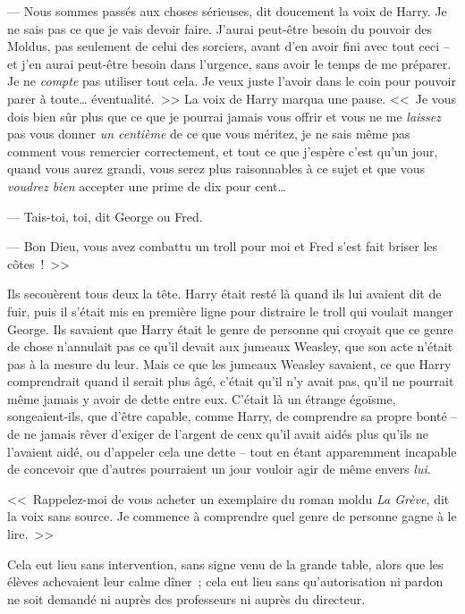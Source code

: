 --- Nous sommes passés aux choses sérieuses, dit doucement la voix de Harry. Je ne sais pas ce que je vais devoir faire. J'aurai peut-être besoin du pouvoir des Moldus, pas seulement de celui des sorciers, avant d'en avoir fini avec tout ceci -- et j'en aurai peut-être besoin dans l'urgence, sans avoir le temps de me préparer. Je ne \emph{compte} pas utiliser tout cela. Je veux juste l'avoir dans le coin pour pouvoir parer à toute… éventualité.~>> La voix de Harry marqua une pause. <<~Je vous dois bien sûr plus que ce que je pourrai jamais vous offrir et vous ne me \emph{laissez} pas vous donner \emph{un centième} de ce que vous méritez, je ne sais même pas comment vous remercier correctement, et tout ce que j'espère c'est qu'un jour, quand vous aurez grandi, vous serez plus raisonnables à ce sujet et que vous \emph{voudrez bien} accepter une prime de dix pour cent…

--- Tais-toi, toi, dit George ou Fred.

--- Bon Dieu, vous avez combattu un troll pour moi et Fred s'est fait briser les côtes~!~>>

Ils secouèrent tous deux la tête. Harry était resté là quand ils lui avaient dit de fuir, puis il s'était mis en première ligne pour distraire le troll qui voulait manger George. Ils savaient que Harry était le genre de personne qui croyait que ce genre de chose n'annulait pas ce qu'il devait aux jumeaux Weasley, que son acte n'était pas à la mesure du leur. Mais ce que les jumeaux Weasley savaient, ce que Harry comprendrait quand il serait plus âgé, c'était qu'il n'y avait pas, qu'il ne pourrait même jamais y avoir de dette entre eux. C'était là un étrange égoïsme, songeaient-ils, que d'être capable, comme Harry, de comprendre sa propre bonté -- de ne jamais rêver d'exiger de l'argent de ceux qu'il avait aidés plus qu'ils ne l'avaient aidé, ou d'appeler cela une dette -- tout en étant apparemment incapable de concevoir que d'autres pourraient un jour vouloir agir de même envers \emph{lui}.

<<~Rappelez-moi de vous acheter un exemplaire du roman moldu \emph{La Grève}, dit la voix sans source. Je commence à comprendre quel genre de personne gagne à le lire.~>>


Cela eut lieu sans intervention, sans signe venu de la grande table, alors que les élèves achevaient leur calme dîner~; cela eut lieu sans qu'autorisation ni pardon ne soit demandé ni auprès des professeurs ni auprès du directeur.

